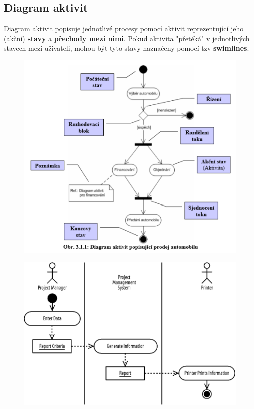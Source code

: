 \subsection{Diagram aktivit}
Diagram aktivit popisuje jednotlivé procesy pomocí aktivit reprezentující jeho (akční) \textbf{stavy} a \textbf{přechody mezi nimi}. Pokud aktivita "přetéká" v jednotlivých stavech mezi uživateli, mohou být tyto stavy naznačeny pomocí tzv \textbf{swimlines}.
\begin{figure}[H]
    \centering
    \includegraphics[width=1\textwidth]{assets/diag_aktivit.png}
\end{figure}

\begin{figure}[H]
	\centering
	\includegraphics[width=1\textwidth]{assets/diag_aktivit_swimlines.gif}
\end{figure}